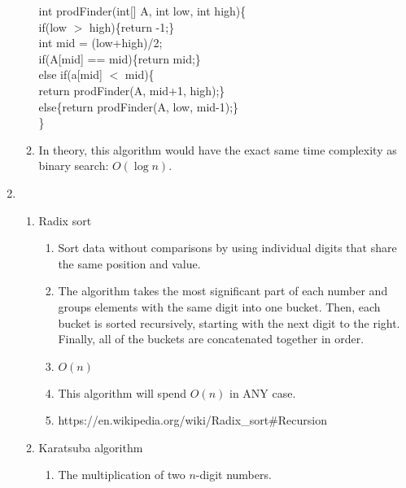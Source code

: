 \documentclass{article}
\begin{document}
\begin{enumerate}
\begin{enumerate}
	int prodFinder(int[] A, int low, int high)\{\\
	if(low \begin{math}>\end{math} high)\{return -1;\}\\
	int mid = (low+high)/2;\\
	if(A[mid] == mid)\{return mid;\}\\
	else if(a[mid] \begin{math}<\end{math} mid)\{\\
	return prodFinder(A, mid+1, high);\}\\
	else\{return prodFinder(A, low, mid-1);\}\\
	\}
	\item In theory, this algorithm would have the exact same time complexity as binary search: \begin{math}O(\log n)\end{math}.
	\end{enumerate}
\item \begin{enumerate}
	\item Radix sort\\\begin{enumerate}
		\item Sort data without comparisons by using individual digits that share the same position and value.
		\item The algorithm takes the most significant part of each number and groups elements with the same digit into one bucket. Then, each bucket is sorted recursively, starting with 
			the next digit to the right. Finally, all of the buckets are concatenated together in order.
		\item \begin{math}O(n)\end{math}
		\item This algorithm will spend \begin{math}O(n)\end{math} in ANY case.
		\item https://en.wikipedia.org/wiki/Radix\_sort\#Recursion
		\end{enumerate}
	\item Karatsuba algorithm\\\begin{enumerate}
		\item The multiplication of two \begin{math}n\end{math}-digit numbers.

\end{enumerate}
\end{enumerate}
\end{enumerate}
\end{document}
